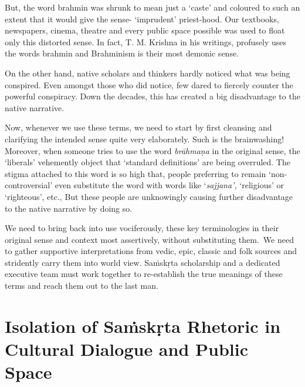 But, the word brahmin was shrunk to mean just a ‘caste’ and coloured to such an extent that it would give the sense- ‘imprudent’ priest-hood. Our textbooks, newspapers, cinema, theatre and every public space possible was used to float only this distorted sense. In fact, T. M. Krishna in his writings, profusely uses the words brahmin and Brahminism is their most demonic sense.

On the other hand, native scholars and thinkers hardly noticed what was being conspired. Even amongst those who did notice, few dared to fiercely counter the powerful conspiracy. Down the decades, this has created a big disadvantage to the native narrative.

Now, whenever we use these terms, we need to start by first cleansing and clarifying the intended sense quite very elaborately. Such is the brainwashing! Moreover, when someone tries to use the word \textit{brāhmaṇa} in the original sense, the ‘liberals’ vehemently object that ‘standard definitions’ are being overruled. The stigma attached to this word is so high that, people preferring to remain ‘non-controversial’ even substitute the word with words like ‘\textit{sajjana’,} ‘religious’ or ‘righteous’, etc., But these people are unknowingly causing further disadvantage to the native narrative by doing so.

We need to bring back into use vociferously, these key terminologies in their original sense and context most assertively, without substituting them.~We need to gather supportive interpretations from vedic, epic, classic and folk sources and stridently carry them into world view. Saṁskṛta scholarship and a dedicated executive team must work together to re-establish the true meanings of these terms and reach them out to the last man.


\vspace{-.45cm}

\section*{Isolation of Saṁskṛta Rhetoric in Cultural Dialogue and Public Space}

